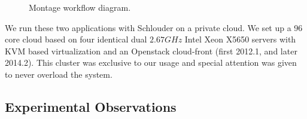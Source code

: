 \documentclass[10pt,conference,compsocconf]{IEEEtran}
\begin{document}
\begin{figure}
	\resizebox{0.5\textwidth}{!}{%
		
		}%
	\caption{Montage workflow diagram.}\label{fig:montage}
\end{figure}

We run these two applications with Schlouder on a private cloud.  We set up a 96
core cloud based on four identical  dual $2.67GHz$ Intel Xeon X5650 servers with
KVM based virtualization  and an Openstack cloud-front (first  2012.1, and later
2014.2). This cluster was exclusive to our usage and special attention was given
to never overload the system.

\subsection{Experimental Observations}
\end{document}
